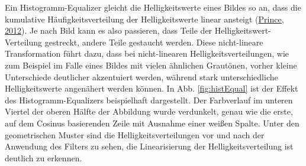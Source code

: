 \documentclass[
  12pt,
  openany]{book}
\begin{document}
Ein Histogramm-Equalizer gleicht die Helligkeitswerte eines Bildes so an, dass die kumulative Häufigkeitsverteilung der Helligkeitswerte linear ansteigt (\protect\hyperlink{ref-princePartIVPreprocessing2012}{Prince, 2012}). Je nach Bild kann es also passieren, dass Teile der Helligkeitswert-Verteilung gestreckt, andere Teile gestaucht werden.
Diese nicht-lineare Transformation führt dazu, dass bei nicht-linearen Helligkeitsverteilungen, wie zum Beispiel im Falle eines Bildes mit vielen ähnlichen Grautönen, vorher kleine Unterschiede deutlicher akzentuiert werden, während stark unterschiedliche Helligkeitswerte angenähert werden können. \newline
In Abb. \ref{fig:histEqual} ist der Effekt des Histogramm-Equalizers beispielhaft dargestellt. Der Farbverlauf im unteren Viertel der oberen Hälfte der Abbildung wurde verdunkelt, genau wie die erste, auf dem Cosinus basierenden Zeile mit Ausnahme einer weißen Spalte. Unter den geometrischen Muster sind die Helligkeitsverteilungen vor und nach der Anwendung des Filters zu sehen, die Linearisierung der Helligkeitsverteilung ist deutlich zu erkennen.
\end{document}
